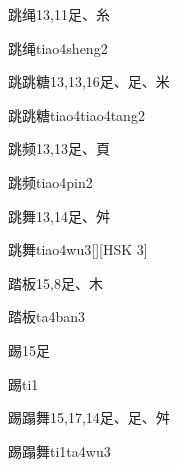 \begin{entry}{跳绳}{13,11}{⾜、⽷}
  \begin{phonetics}{跳绳}{tiao4sheng2}
  \end{phonetics}
\end{entry}

\begin{entry}{跳跳糖}{13,13,16}{⾜、⾜、⽶}
  \begin{phonetics}{跳跳糖}{tiao4tiao4tang2}
  \end{phonetics}
\end{entry}

\begin{entry}{跳频}{13,13}{⾜、⾴}
  \begin{phonetics}{跳频}{tiao4pin2}
  \end{phonetics}
\end{entry}

\begin{entry}{跳舞}{13,14}{⾜、⾇}
  \begin{phonetics}{跳舞}{tiao4wu3}[][HSK 3]
  \end{phonetics}
\end{entry}

\begin{entry}{踏板}{15,8}{⾜、⽊}
  \begin{phonetics}{踏板}{ta4ban3}
  \end{phonetics}
\end{entry}

\begin{entry}{踢}{15}{⾜}
  \begin{phonetics}{踢}{ti1}
  \end{phonetics}
\end{entry}

\begin{entry}{踢蹋舞}{15,17,14}{⾜、⾜、⾇}
  \begin{phonetics}{踢蹋舞}{ti1ta4wu3}
  \end{phonetics}
\end{entry}

